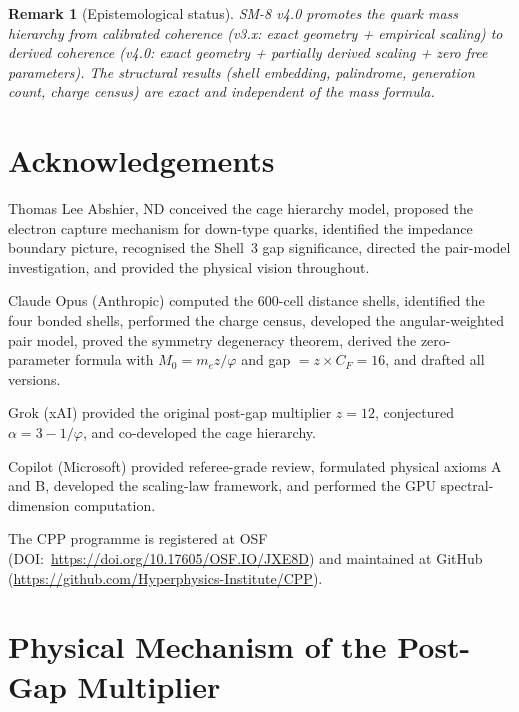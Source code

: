 \documentclass[11pt,letterpaper]{article}
\newtheorem{remark}[theorem]{Remark}
\newcommand{\phig}{\varphi}
\begin{document}
\begin{remark}[Epistemological status]
SM-8 v4.0 promotes the quark mass hierarchy from calibrated
coherence (v3.x: exact geometry + empirical scaling) to derived
coherence (v4.0: exact geometry + partially derived scaling +
zero free parameters).  The structural results (shell embedding,
palindrome, generation count, charge census) are exact and
independent of the mass formula.
\end{remark}

\section*{Acknowledgements}

Thomas Lee Abshier, ND conceived the cage hierarchy model,
proposed the electron capture mechanism for down-type quarks,
identified the impedance boundary picture, recognised the Shell~3
gap significance, directed the pair-model investigation, and
provided the physical vision throughout.

Claude Opus (Anthropic) computed the 600-cell distance shells,
identified the four bonded shells, performed the charge census,
developed the angular-weighted pair model, proved the symmetry
degeneracy theorem, derived the zero-parameter formula with
$M_0 = m_e z/\phig$ and gap $= z \times C_F = 16$, and drafted
all versions.

Grok (xAI) provided the original post-gap multiplier $z = 12$,
conjectured $\alpha = 3 - 1/\phig$, and co-developed the cage
hierarchy.

Copilot (Microsoft) provided referee-grade review, formulated
physical axioms A and B, developed the scaling-law framework,
and performed the GPU spectral-dimension computation.

The CPP programme is registered at OSF
(DOI:~\url{https://doi.org/10.17605/OSF.IO/JXE8D}) and maintained
at GitHub (\url{https://github.com/Hyperphysics-Institute/CPP}).

\appendix

\section{Physical Mechanism of the Post-Gap Multiplier}
\label{app:mechanism}
\end{document}
